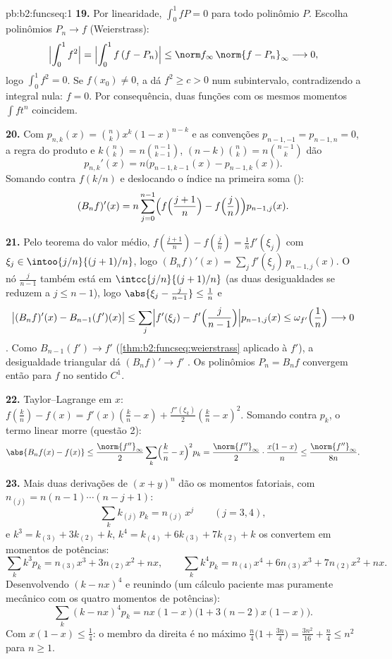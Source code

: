\begin{solution}{pb:b2:funcseq:1}
\textbf{19.} Por linearidade, $\int_0^1 fP = 0$ para todo
polinômio $P$. Escolha polinômios $P_n \to f$ 
(Weierstrass):
\[
\Bigl|\int_0^1 f^2\Bigr|
= \Bigl|\int_0^1 f\,(f - P_n)\Bigr|
\leq \norm f_\infty\,\norm{f - P_n}_\infty
\longrightarrow 0 ,
\]
logo $\int_0^1 f^2 = 0$. Se $f(x_0) \neq 0$, a  dá
$f^2 \geq c > 0$ num subintervalo, contradizendo a integral
nula: $f = 0$. Por consequência, duas funções  com
os mesmos momentos $\int f t^n$ coincidem.

\textbf{20.} Com $p_{n,k}(x) = \binom nk x^k(1-x)^{n-k}$ e
as convenções $p_{n-1,-1} = p_{n-1,n} = 0$, a regra do produto
e $k\binom nk = n\binom{n-1}{k-1}$, $(n-k)\binom nk =
n\binom{n-1}{k}$ dão
\[
p_{n,k}'(x) = n\bigl(p_{n-1,k-1}(x) - p_{n-1,k}(x)\bigr) .
\]
Somando contra $f(k/n)$ e deslocando o índice na primeira
soma ():
\[
(B_nf)'(x) = n\sum_{j=0}^{n-1}\Bigl(f\Bigl(\frac{j+1}n\Bigr)
- f\Bigl(\frac jn\Bigr)\Bigr)p_{n-1,j}(x) .
\]

\textbf{21.} Pelo teorema do valor médio, $f(\frac{j+1}n) -
f(\frac jn) = \frac1n f'(\xi_j)$ com $\xi_j \in
\intoo{j/n}{(j+1)/n}$, logo $(B_nf)'(x) = \sum_j
f'(\xi_j)\,p_{n-1,j}(x)$. O nó $\frac{j}{n-1}$ também está em
$\intcc{j/n}{(j+1)/n}$ (as duas desigualdades se reduzem a $j \leq
n-1$), logo $\abs{\xi_j - \frac j{n-1}} \leq \frac1n$ e
\[
\bigl|(B_nf)'(x) - B_{n-1}(f')(x)\bigr|
\leq \sum_j\Bigl|f'(\xi_j) -
f'\Bigl(\frac{j}{n-1}\Bigr)\Bigr| p_{n-1,j}(x)
\leq \omega_{f'}\Bigl(\frac1n\Bigr) \longrightarrow 0
\]
. Como $B_{n-1}(f') \to f'$ 
(\cref{thm:b2:funcseq:weierstrass} aplicado à 
$f'$), a desigualdade triangular dá $(B_nf)' \to f'$
. Os polinômios $P_n = B_nf$ convergem então para $f$
no sentido $C^1$.

\textbf{22.} Taylor--Lagrange em $x$: $f(\frac kn) - f(x) =
f'(x)(\frac kn - x) + \frac{f''(\xi_k)}2(\frac kn - x)^2$.
Somando contra $p_k$, o termo linear morre (questão 2):
\[
\abs{B_nf(x) - f(x)}
\leq \frac{\norm{f''}_\infty}{2}\sum_k\Bigl(\frac kn -
x\Bigr)^2p_k
= \frac{\norm{f''}_\infty}{2}\cdot\frac{x(1-x)}{n}
\leq \frac{\norm{f''}_\infty}{8n} .
\]

\textbf{23.} Mais duas derivações de $(x+y)^n$ dão os
momentos fatoriais, com $n_{(j)} = n(n-1)\cdots(n-j+1)$:
\[
\sum_k k_{(j)}\,p_k = n_{(j)}\,x^j \qquad (j = 3, 4),
\]
e $k^3 = k_{(3)} + 3k_{(2)} + k$, $k^4 = k_{(4)} + 6k_{(3)} +
7k_{(2)} + k$ os convertem em momentos de potências:
\[
\sum_k k^3p_k = n_{(3)}x^3 + 3n_{(2)}x^2 + nx,
\qquad
\sum_k k^4p_k = n_{(4)}x^4 + 6n_{(3)}x^3 + 7n_{(2)}x^2 + nx .
\]
Desenvolvendo $(k - nx)^4$ e reunindo (um cálculo paciente mas puramente
mecânico com os quatro momentos de potências):
\[
\sum_k(k-nx)^4p_k = nx(1-x)\bigl(1 + 3(n-2)x(1-x)\bigr) .
\]
Com $x(1-x) \leq \frac14$: o membro da direita é no máximo
$\frac n4\bigl(1 + \frac{3n}4\bigr) = \frac{3n^2}{16} +
\frac n4 \leq n^2$ para $n \geq 1$.


\end{solution}
